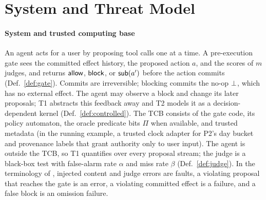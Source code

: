 \section{System and Threat Model}\label{sec:threat}

\paragraph{System and trusted computing base}
An agent acts for a user by proposing tool calls one at a time. A pre-execution gate sees
the committed effect history, the proposed action $a$, and the scores of $m$ judges, and
returns $\mathsf{allow}$, $\mathsf{block}$, or $\mathsf{sub}(a')$ before the action commits
(Def.~\ref{def:gate}). Commits are irreversible; blocking commits the no-op $\bot$, which
has no external effect. The agent may observe a block and change its later proposals; T1 abstracts
this feedback away and T2 models it as a decision-dependent kernel
(Def.~\ref{def:controlled}). The TCB consists of the gate code, its policy automaton, the
oracle predicate bits $\Pi$ when available, and trusted metadata (in the running example, a
trusted clock adapter for P2's day bucket and provenance labels that grant authority only to
user input). The agent is outside the TCB, so T1 quantifies over every proposal stream; the
judge is a black-box test with false-alarm rate $\alpha$ and miss rate $\beta$
(Def.~\ref{def:judge}). In the terminology of \citet{avizienis2004basic}, injected content
and judge errors are faults, a violating proposal that reaches the gate is an error, a
violating committed effect is a failure, and a false block is an omission failure.

